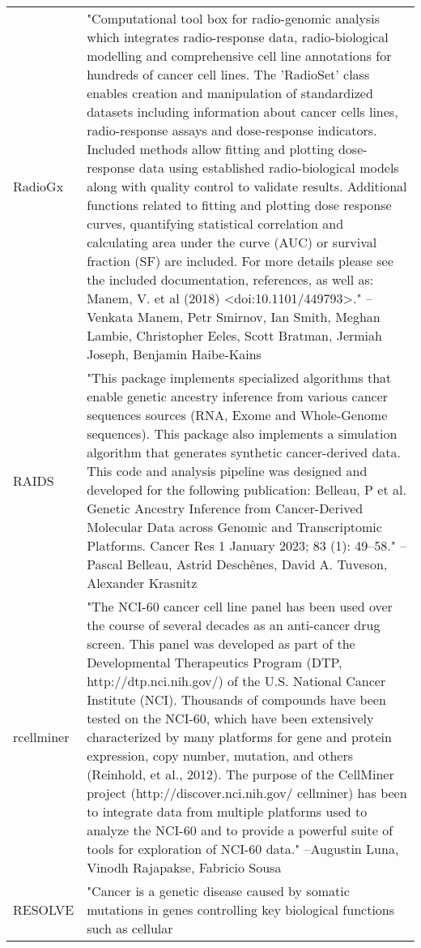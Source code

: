\begin{longtable}[t]{l>{\raggedright\arraybackslash}p{25em}}
\addlinespace
RadioGx & "Computational tool box for radio-genomic analysis which
integrates radio-response data, radio-biological modelling and
comprehensive cell line annotations for hundreds of cancer cell
lines. The 'RadioSet' class enables creation and manipulation
of standardized datasets including information about cancer
cells lines, radio-response assays and dose-response
indicators. Included methods allow fitting and plotting
dose-response data using established radio-biological models
along with quality control to validate results. Additional
functions related to fitting and plotting dose response curves,
quantifying statistical correlation and calculating area under
the curve (AUC) or survival fraction (SF) are included. For
more details please see the included documentation, references,
as well as: Manem, V. et al (2018) <doi:10.1101/449793>." --Venkata Manem, Petr Smirnov, Ian Smith, Meghan Lambie, Christopher Eeles, Scott Bratman, Jermiah Joseph, Benjamin Haibe-Kains\\
RAIDS & "This package implements specialized algorithms that enable
genetic ancestry inference from various cancer sequences
sources (RNA, Exome and Whole-Genome sequences). This package
also implements a simulation algorithm that generates synthetic
cancer-derived data. This code and analysis pipeline was
designed and developed for the following publication: Belleau,
P et al. Genetic Ancestry Inference from Cancer-Derived
Molecular Data across Genomic and Transcriptomic Platforms.
Cancer Res 1 January 2023; 83 (1): 49–58." --Pascal Belleau, Astrid Deschênes, David A. Tuveson, Alexander Krasnitz\\
rcellminer & "The NCI-60 cancer cell line panel has been used over the
course of several decades as an anti-cancer drug screen. This
panel was developed as part of the Developmental Therapeutics
Program (DTP, http://dtp.nci.nih.gov/) of the U.S. National
Cancer Institute (NCI). Thousands of compounds have been tested
on the NCI-60, which have been extensively characterized by
many platforms for gene and protein expression, copy number,
mutation, and others (Reinhold, et al., 2012). The purpose of
the CellMiner project (http://discover.nci.nih.gov/ cellminer)
has been to integrate data from multiple platforms used to
analyze the NCI-60 and to provide a powerful suite of tools for
exploration of NCI-60 data." --Augustin Luna, Vinodh Rajapakse, Fabricio Sousa\\
RESOLVE & "Cancer is a genetic disease caused by somatic mutations in
genes controlling key biological functions such as cellular

\end{longtable}
